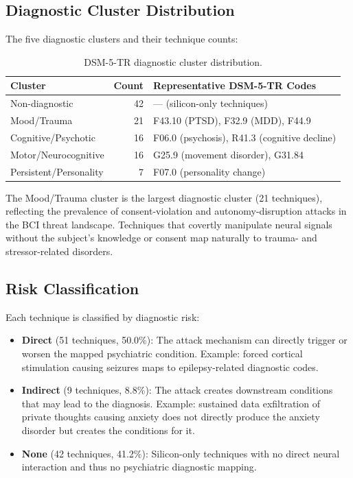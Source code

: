 \subsection{Diagnostic Cluster Distribution}

The five diagnostic clusters and their technique counts:

\begin{table}[H]
\centering
\caption{DSM-5-TR diagnostic cluster distribution.}
\label{tab:clusters}
\small
\begin{tabularx}{\textwidth}{@{}l r X@{}}
\toprule
\textbf{Cluster} & \textbf{Count} & \textbf{Representative DSM-5-TR Codes} \\
\midrule
Non-diagnostic          & 42 & --- (silicon-only techniques) \\
Mood/Trauma             & 21 & F43.10 (PTSD), F32.9 (MDD), F44.9 \\
Cognitive/Psychotic     & 16 & F06.0 (psychosis), R41.3 (cognitive decline) \\
Motor/Neurocognitive    & 16 & G25.9 (movement disorder), G31.84 \\
Persistent/Personality  &  7 & F07.0 (personality change) \\
\bottomrule
\end{tabularx}
\end{table}

The Mood/Trauma cluster is the largest diagnostic cluster (21 techniques),
reflecting the prevalence of consent-violation and autonomy-disruption attacks
in the BCI threat landscape. Techniques that covertly manipulate neural signals
without the subject's knowledge or consent map naturally to trauma- and
stressor-related disorders.

\subsection{Risk Classification}

Each technique is classified by diagnostic risk:

\begin{itemize}
  \item \textbf{Direct} (51 techniques, 50.0\%): The attack mechanism can
        directly trigger or worsen the mapped psychiatric condition. Example:
        forced cortical stimulation causing seizures maps to epilepsy-related
        diagnostic codes.
  \item \textbf{Indirect} (9 techniques, 8.8\%): The attack creates downstream
        conditions that may lead to the diagnosis. Example: sustained data
        exfiltration of private thoughts causing anxiety does not directly
        produce the anxiety disorder but creates the conditions for it.
  \item \textbf{None} (42 techniques, 41.2\%): Silicon-only techniques with no
        direct neural interaction and thus no psychiatric diagnostic mapping.
\end{itemize}

